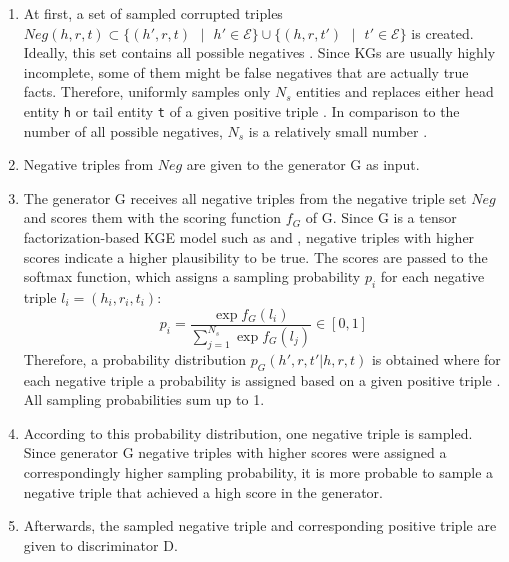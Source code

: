 \begin{enumerate}
    \item 
    At first, a set of sampled corrupted triples $Neg(h,r,t)\subset\{(h',r,t) \text{ } | \text{ } h' \in \mathcal{E}\} \cup \{(h,r,t') \text{ } | \text{ } t'\in\mathcal{E}\}$ is created.
    Ideally, this set contains all possible negatives \cite{cai2017kbgan}.
    Since \acp{KG} are usually highly incomplete, some of them might be false negatives that are actually true facts.
    Therefore, \kbgan uniformly samples only $N_s$ entities and replaces either head entity \texttt{h} or tail entity \texttt{t} of a given positive triple .
    In comparison to the number of all possible negatives, $N_s$ is a relatively small number \cite{cai2017kbgan}.
    
    \item 
    Negative triples from $Neg$ are given to the generator G as input.
    
    \item 
    The generator G receives all negative triples from the negative triple set $Neg$ and scores them with the scoring function $f_G$ of G.
    Since G is a tensor factorization-based \ac{KGE} model such as \distmult and \complex, negative triples with higher scores indicate a higher plausibility to be true.
    The scores are passed to the softmax function, which assigns a sampling probability $p_i$ for each negative triple $l_i = (h_i, r_i, t_i)$:
    \begin{equation} \label{eq:origsampling}
        p_i = \frac{\exp{f_G(l_i)}}{\sum_{j=1}^{N_s}{\exp{f_G(l_j)}}} \in [0,1]
    \end{equation}
    Therefore, a probability distribution $p_G(h',r,t'|h,r,t)$ is obtained where for each negative triple  a probability is assigned based on a given positive triple . 
    All sampling probabilities sum up to 1.
    
    \item
    According to this probability distribution, one negative triple is sampled.
    Since generator G negative triples with higher scores were assigned a correspondingly higher sampling probability, it is more probable to sample a negative triple that achieved a high score in the generator.

    \item 
    Afterwards, the sampled negative triple  and corresponding positive triple  are given to discriminator D.
    

\end{enumerate}
